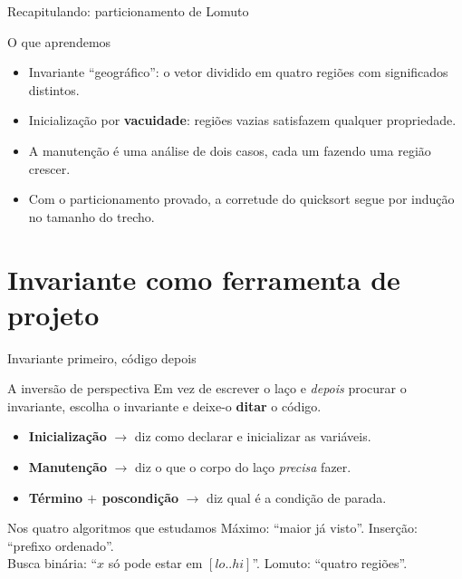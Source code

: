 \documentclass[aspectratio=169]{beamer}
\begin{document}
\begin{frame}{Recapitulando: particionamento de Lomuto}
  \begin{block}{O que aprendemos}
    \begin{itemize}
      \item Invariante ``geográfico'': o vetor dividido em quatro regiões com
        significados distintos.
      \item Inicialização por \textbf{vacuidade}: regiões vazias satisfazem qualquer
        propriedade.
      \item A manutenção é uma análise de dois casos, cada um fazendo uma região crescer.
      \item Com o particionamento provado, a corretude do quicksort segue por indução
        no tamanho do trecho.
    \end{itemize}
  \end{block}
\end{frame}

\section{Invariante como ferramenta de projeto}

\begin{frame}{Invariante primeiro, código depois}
  \begin{block}{A inversão de perspectiva}
    Em vez de escrever o laço e \emph{depois} procurar o invariante, escolha o
    invariante e deixe-o \textbf{ditar} o código.
  \end{block}
  \begin{itemize}
    \item \textbf{Inicialização} $\rightarrow$ diz como declarar e inicializar as variáveis.
    \item \textbf{Manutenção} $\rightarrow$ diz o que o corpo do laço \emph{precisa} fazer.
    \item \textbf{Término $+$ poscondição} $\rightarrow$ diz qual é a condição de parada.
  \end{itemize}
  \begin{exampleblock}{Nos quatro algoritmos que estudamos}
    Máximo: ``maior já visto''. \quad Inserção: ``prefixo ordenado''.\\
    Busca binária: ``$x$ só pode estar em $[lo..hi]$''. \quad Lomuto: ``quatro regiões''.
  \end{exampleblock}
\end{frame}
\end{document}
